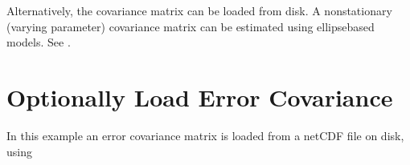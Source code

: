 \documentclass[letterpaper,10pt,english]{sphinxmanual}
\begin{document}
\begin{sphinxVerbatim}[commandchars=\\\{\}]
  

  

   
\end{sphinxVerbatim}

\sphinxAtStartPar
Alternatively, the covariance matrix can be loaded from disk. A non\sphinxhyphen{}stationary (varying parameter)
covariance matrix can be estimated using ellipse\sphinxhyphen{}based models. See
{\hyperref[\detokenize{ellipse:glomar_gridding.ellipse.EllipseModel}]{}}.


\section{Optionally Load Error Covariance}
\label{\detokenize{workflow:optionally-load-error-covariance}}
\sphinxAtStartPar
In this example an error covariance matrix is loaded from a netCDF file on disk, using
{\hyperref[\detokenize{misc:glomar_gridding.io.load_array}]{}}

\begin{sphinxVerbatim}[commandchars=\\\{\}]
   
\end{sphinxVerbatim}
\end{document}
